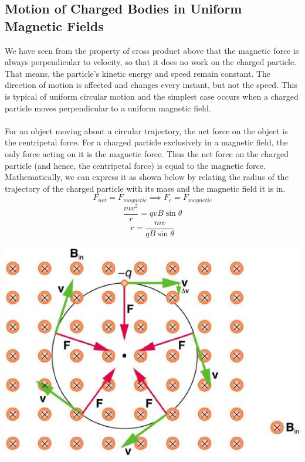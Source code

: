 \documentclass[9pt]{article}
\begin{document}
	\subsection*{Motion of Charged Bodies in Uniform Magnetic Fields}
	 We have seen from the property of cross product above that the magnetic force is always perpendicular to velocity, so that it does no work on the charged particle. That means, the particle’s kinetic energy and speed remain constant. The direction of motion is affected and changes every instant, but not the speed. This is typical of uniform circular motion and the simplest case occurs when a charged particle moves perpendicular to a uniform  magnetic field. \\ \\
	 For an object moving about a circular trajectory, the net force on the object is the centripetal force. For a charged particle exclusively in a magnetic field, the only force acting on it is the magnetic force. Thus the net force on the charged particle (and hence, the centripetal force) is equal to the magnetic force. Mathematically, we can express it as shown below by relating the radius of the trajectory of the charged particle with its mass and the magnetic field it is in.
	 $$F_{net}=F_{magnetic}\implies F_{c}=F_{magnetic}$$
	 $$\dfrac{mv^2}{r}=qvB\sin\theta$$
	 $$r=\dfrac{mv}{qB\sin\theta}$$	 
	 \begin{center}
	 	\includegraphics*[scale=0.3]{charged_circular_path.jpg}
	 \end{center}
\end{document}
